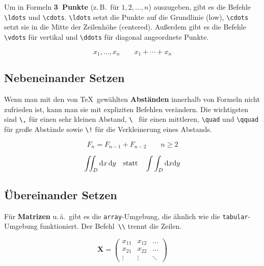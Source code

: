 Um in Formeln \textbf{3~Punkte} (z.\,B.\ für \(1,2,\ldots,n\))
auszugeben, gibt es die Befehle
\lstinline|\ldots| und \lstinline|\cdots|.
\lstinline|\ldots| setzt die Punkte auf die Grundlinie (low),
\lstinline|\cdots| setzt sie in die Mitte der Zeilenhöhe
(centered).
Außerdem gibt es die Befehle
\lstinline|\vdots| für vertikal und
\lstinline|\ddots| für diagonal angeordnete Punkte.

\begin{LTXexample}
\[
x_{1},\ldots,x_{n} \qquad
x_{1}+\cdots+x_{n}
\]
\end{LTXexample}


\subsection{Nebeneinander Setzen}
 
Wenn man mit den von \TeX\ gewählten \textbf{Abständen}
innerhalb von Formeln nicht zufrieden ist, kann man sie mit
expliziten Befehlen verändern. Die wichtigsten sind
\lstinline|\,| für einen sehr kleinen Abstand,
\lstinline|\ | für einen mittleren,
\lstinline|\quad| und \lstinline|\qquad| für große Abstände sowie
\lstinline|\!| für die Verkleinerung eines Abstands.

\begin{LTXexample}
\[
F_{n} = F_{n-1} + F_{n-2}
 \qquad n \ge 2
\]
\end{LTXexample}


\begin{LTXexample}
\[
\int\!\!\!\int_{D} 
\mathrm{d}x\,\mathrm{d}y
\quad \textnormal{statt} \quad
\int\int_{D} 
\mathrm{d}x \mathrm{d}y
\]
\end{LTXexample}



\subsection{Übereinander Setzen}

Für \textbf{Matrizen} u.\,ä.\ gibt es die
\texttt{array}-Umgebung, die ähnlich wie die
\texttt{tabular}-Umgebung funktioniert.
Der Befehl~\lstinline|\\| trennt die Zeilen.

\begin{LTXexample}
\[
\mathbf{X} =
\left( \begin{array}{ccc}
x_{11} & x_{12} & \ldots \\
x_{21} & x_{22} & \ldots \\
\vdots & \vdots & \ddots
\end{array} \right)
\]
\end{LTXexample}


